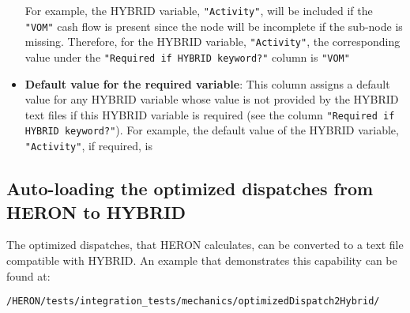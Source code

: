 \begin{itemize}
 For example, the HYBRID variable, \verb|"Activity"|, will be included if the \verb|"VOM"| cash flow is present since the node  will be incomplete if the  sub-node is missing. Therefore, for the HYBRID variable, \verb|"Activity"|, the corresponding value under the \verb|"Required if HYBRID keyword?"| column is \verb|"VOM"|
 
 \item \textbf{Default value for the required variable}: This column assigns a default value for any HYBRID variable whose value is not provided by the HYBRID text files if this HYBRID variable is required (see the column \verb|"Required if HYBRID keyword?"|). For example, the default value of the HYBRID variable, \verb|"Activity"|, if required, is  
\end{itemize}

\subsection{Auto-loading the optimized dispatches from HERON to HYBRID}
The optimized dispatches, that HERON calculates, can be converted to a text file compatible with HYBRID. An example that demonstrates this capability can be found at: 
\begin{lstlisting}
/HERON/tests/integration_tests/mechanics/optimizedDispatch2Hybrid/
\end{lstlisting}



